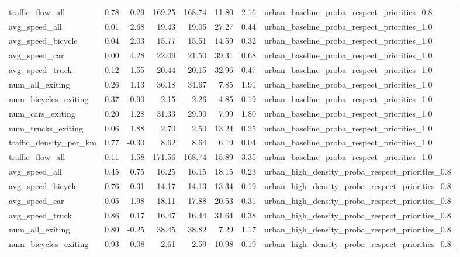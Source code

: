 \begin{table}[ht]
\begin{tabular}{lrrrrrrl}
  traffic\_flow\_all & 0.78 & 0.29 & 169.25 & 168.74 & 11.80 & 2.16 & urban\_baseline\_proba\_respect\_priorities\_0.8 \\ 
  avg\_speed\_all & 0.01 & 2.68 & 19.43 & 19.05 & 27.27 & 0.44 & urban\_baseline\_proba\_respect\_priorities\_1.0 \\ 
  avg\_speed\_bicycle & 0.04 & 2.03 & 15.77 & 15.51 & 14.59 & 0.32 & urban\_baseline\_proba\_respect\_priorities\_1.0 \\ 
  avg\_speed\_car & 0.00 & 4.28 & 22.09 & 21.50 & 39.31 & 0.68 & urban\_baseline\_proba\_respect\_priorities\_1.0 \\ 
  avg\_speed\_truck & 0.12 & 1.55 & 20.44 & 20.15 & 32.96 & 0.47 & urban\_baseline\_proba\_respect\_priorities\_1.0 \\ 
  num\_all\_exiting & 0.26 & 1.13 & 36.18 & 34.67 & 7.85 & 1.91 & urban\_baseline\_proba\_respect\_priorities\_1.0 \\ 
  num\_bicycles\_exiting & 0.37 & -0.90 & 2.15 & 2.26 & 4.85 & 0.19 & urban\_baseline\_proba\_respect\_priorities\_1.0 \\ 
  num\_cars\_exiting & 0.20 & 1.28 & 31.33 & 29.90 & 7.99 & 1.80 & urban\_baseline\_proba\_respect\_priorities\_1.0 \\ 
  num\_trucks\_exiting & 0.06 & 1.88 & 2.70 & 2.50 & 13.24 & 0.25 & urban\_baseline\_proba\_respect\_priorities\_1.0 \\ 
  traffic\_density\_per\_km & 0.77 & -0.30 & 8.62 & 8.64 & 6.19 & 0.04 & urban\_baseline\_proba\_respect\_priorities\_1.0 \\ 
  traffic\_flow\_all & 0.11 & 1.58 & 171.56 & 168.74 & 15.89 & 3.35 & urban\_baseline\_proba\_respect\_priorities\_1.0 \\ 
  avg\_speed\_all & 0.45 & 0.75 & 16.25 & 16.15 & 18.15 & 0.23 & urban\_high\_density\_proba\_respect\_priorities\_0.8 \\ 
  avg\_speed\_bicycle & 0.76 & 0.31 & 14.17 & 14.13 & 13.34 & 0.19 & urban\_high\_density\_proba\_respect\_priorities\_0.8 \\ 
  avg\_speed\_car & 0.05 & 1.98 & 18.11 & 17.88 & 20.53 & 0.31 & urban\_high\_density\_proba\_respect\_priorities\_0.8 \\ 
  avg\_speed\_truck & 0.86 & 0.17 & 16.47 & 16.44 & 31.64 & 0.38 & urban\_high\_density\_proba\_respect\_priorities\_0.8 \\ 
  num\_all\_exiting & 0.80 & -0.25 & 38.45 & 38.82 & 7.29 & 1.17 & urban\_high\_density\_proba\_respect\_priorities\_0.8 \\ 
  num\_bicycles\_exiting & 0.93 & 0.08 & 2.61 & 2.59 & 10.98 & 0.19 & urban\_high\_density\_proba\_respect\_priorities\_0.8 \\ 

\end{tabular}
\end{table}
